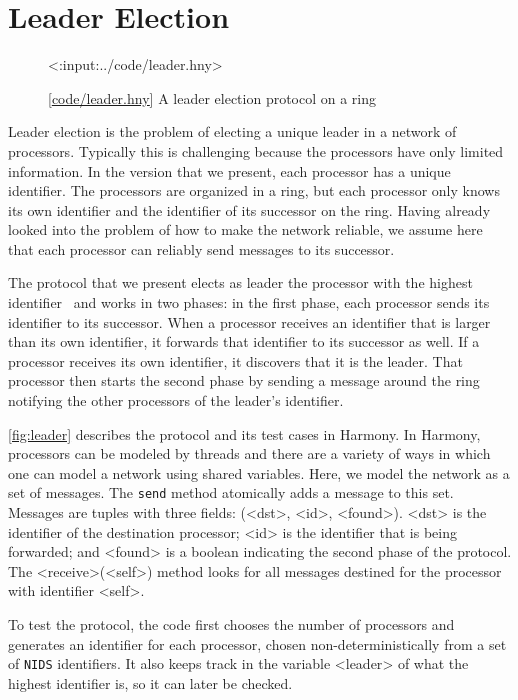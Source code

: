 \documentclass{report}
\newcommand{\harmonylink}[1]{%
[\href{https://harmony.cs.cornell.edu/#1}{\underline{#1}}]%
}
\newenvironment{code}{
\tcolorbox
}{
\endtcolorbox
}
\begin{document}
\chapter{Leader Election}
\label{ch:leader}

\begin{figure}
\begin{code}
<{:input:../code/leader.hny}>
\end{code}
\caption{\harmonylink{code/leader.hny} A leader election protocol on a ring}
\label{fig:leader}
\end{figure}

Leader election is the problem of electing a unique leader in a
network of processors.  Typically this is challenging because the
processors have only limited information.  In the version that we
present, each processor has a unique identifier.  The processors
are organized in a ring, but each processor only knows its own
identifier and the identifier of its successor on the ring.  Having
already looked into the problem of how to make the network reliable,
we assume here that each processor can reliably send messages to
its successor.

The protocol that we present elects as leader the processor with
the highest identifier~\cite{CR79} and works in two phases: in the
first phase, each processor sends its identifier to its successor.
When a processor receives an identifier that is larger than its own
identifier, it forwards that identifier to its successor as well.
If a processor receives its own identifier, it discovers that it
is the leader.  That processor then starts the second phase by
sending a message around the ring notifying the other processors
of the leader's identifier.

\autoref{fig:leader} describes the protocol and its test cases in
Harmony.  In Harmony, processors can be modeled by threads and there
are a variety of ways in which one can model a network using shared
variables.  Here, we model the network as a set of messages.  The
\texttt{send} method atomically adds a message to this set.  Messages
are tuples with three fields: (<{dst}>, <{id}>, <{found}>).  <{dst}>
is the identifier of the destination processor; <{id}> is the
identifier that is being forwarded; and <{found}> is a boolean
indicating the second phase of the protocol.  The <{receive}>(<{self}>)
method looks for all messages destined for the processor with
identifier <{self}>.

To test the protocol, the code first chooses the number of processors
and generates an identifier for each
processor, chosen non-deterministically from a set of \texttt{NIDS}
identifiers.  It also keeps track in the variable <{leader}> of
what the highest identifier is, so it can later be checked.
\end{document}
